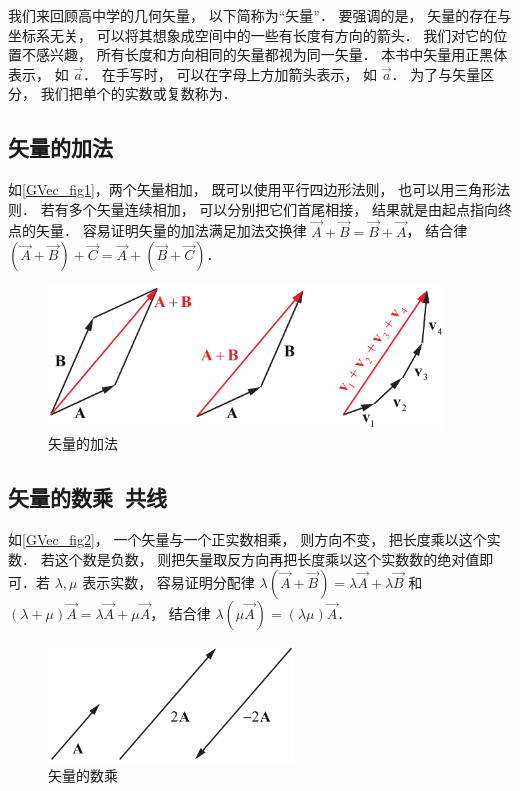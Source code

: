 
我们来回顾高中学的几何矢量， 以下简称为“矢量”． 要强调的是， 矢量的存在与坐标系无关， 可以将其想象成空间中的一些有长度有方向的箭头． 我们对它的位置不感兴趣， 所有长度和方向相同的矢量都视为同一矢量． 本书中矢量用正黑体表示， 如 $\vec a$． 在手写时， 可以在字母上方加箭头表示， 如 $\overrightarrow{a}$． 为了与矢量区分， 我们把单个的实数或复数称为．

\subsection{矢量的加法}
如\autoref{GVec_fig1}，两个矢量相加， 既可以使用平行四边形法则， 也可以用三角形法则． 若有多个矢量连续相加， 可以分别把它们首尾相接， 结果就是由起点指向终点的矢量． 容易证明矢量的加法满足加法交换律 $\vec A + \vec B = \vec B + \vec A$， 结合律 $(\vec A + \vec B) + \vec C = \vec A + (\vec B + \vec C)$．
\begin{figure}[ht]
\centering
\includegraphics[width=10.5cm]{./figures/GVec1.pdf}
\caption{矢量的加法} \label{GVec_fig1}
\end{figure}

\subsection{矢量的数乘\ 共线}
如\autoref{GVec_fig2}， 一个矢量与一个正实数相乘， 则方向不变， 把长度乘以这个实数． 若这个数是负数， 则把矢量取反方向再把长度乘以这个实数数的绝对值即可．若 $\lambda, \mu$ 表示实数， 容易证明分配律 $\lambda(\vec A + \vec B) = \lambda\vec A + \lambda\vec B$ 和 $(\lambda+\mu)\vec A = \lambda\vec A + \mu\vec A$， 结合律 $\lambda(\mu\vec A) = (\lambda\mu) \vec A$．
\begin{figure}[ht]
\centering
\includegraphics[width=6.5cm]{./figures/GVec2.pdf}
\caption{矢量的数乘} \label{GVec_fig2}
\end{figure}

